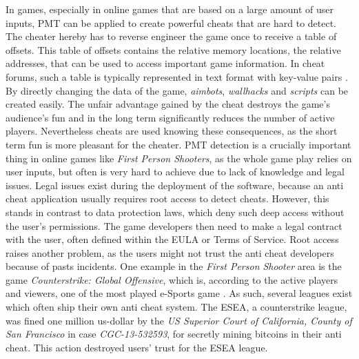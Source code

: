 In games, especially in online games that are based on a large amount of user inputs, \gls{PMT} can be applied to create powerful cheats that are hard to detect. The cheater hereby has to reverse engineer the game once to receive a table of offsets. This table of offsets contains the relative memory locations, the relative addresses, that can be used to access important game information. In cheat forums, such a table is typically represented in text format with key-value pairs \cite{offsets}. By directly changing the data of the game, \emph{aimbots}, \emph{wallhacks} and \emph{scripts} can be created easily. The unfair advantage gained by the cheat destroys the game's audience's fun and in the long term significantly reduces the number of active players. Nevertheless cheats are used knowing these consequences, as the short term fun is more pleasant for the cheater. \gls{PMT} detection is a crucially important thing in online games like \emph{First Person Shooters}, as the whole game play relies on user inputs, but often is very hard to achieve due to lack of knowledge and legal issues. Legal issues exist during the deployment of the software, because an anti cheat application usually requires root access to detect cheats. However, this stands in contrast to data protection laws, which deny such deep access without the user's permissions. The game developers then need to make a legal contract with the user, often defined within the \gls{EULA} or Terms of Service. Root access raises another problem, as the users might not trust the anti cheat developers because of pasts incidents. One example in the \emph{First Person Shooter} area is the game \emph{Counterstrike: Global Offensive}, which is, according to the active players and viewers, one of the most played e-Sports game \cite{csgo1, csgo2}. As such, several leagues exist which often ship their own anti cheat system. The \gls{ESEA}, a counterstrike league, was fined one million us-dollar by the \emph{US Superior Court of California, County of San Francisco} \cite{esea} in case \emph{CGC-13-532593}, for secretly mining bitcoins in their anti cheat. This action destroyed users' trust for the \gls{ESEA} league.